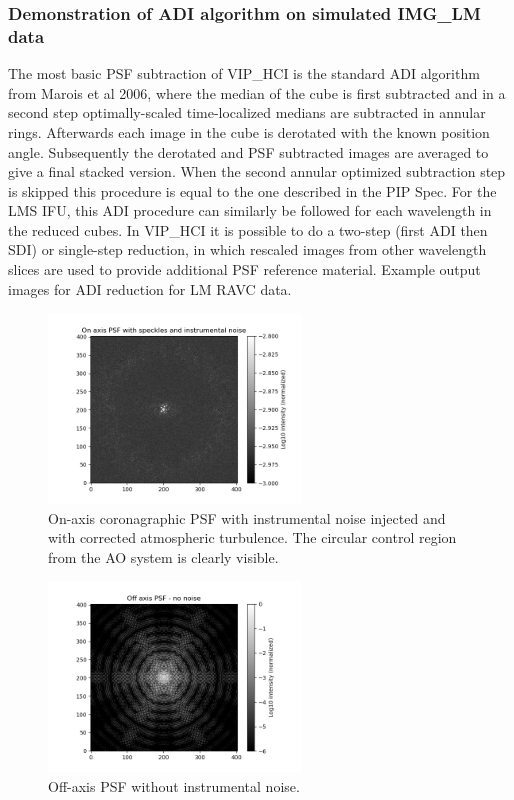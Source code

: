 \subsubsection{Demonstration of ADI algorithm on simulated IMG\_LM data}
The most basic PSF subtraction of VIP\_HCI is the standard ADI algorithm from Marois et al 2006, where the median of the cube is first subtracted and in a second step optimally-scaled time-localized medians are subtracted in annular rings. Afterwards each image in the cube is derotated with the known position angle. Subsequently the derotated and PSF subtracted images are averaged to give a final stacked version. When the second annular optimized subtraction step is skipped this procedure is equal to the one described in the PIP Spec.
For the LMS IFU, this ADI procedure can similarly be followed for each wavelength in the reduced cubes. In VIP\_HCI it is possible to do a two-step (first ADI then SDI) or single-step reduction, in which rescaled images from other wavelength slices are used to provide additional PSF reference material.
Example output images for ADI reduction for LM RAVC data.


\begin{figure}[!ht]
  \centering
  \includegraphics[width=0.6\textwidth]{./figures/onaxis_psf.png}
  \caption{On-axis coronagraphic PSF with instrumental noise injected and with corrected atmospheric turbulence. The circular control region from the AO system is clearly visible.}
\end{figure}
\begin{figure}[!ht]
  \centering
  \includegraphics[width=0.6\textwidth]{./figures/offaxis_psf.png}
  \caption{Off-axis PSF without instrumental noise.}
\end{figure}

